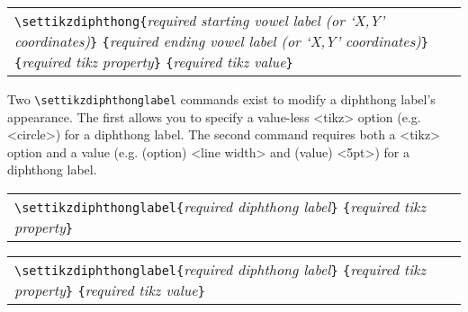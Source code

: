 \documentclass{article}
\newcommand{\pkg}[1]{\texttt{#1}}
\def\\{}%
\def\texttt#1{<#1>}%
\begin{document}
\begin{center}
	\begin{tabular}{l}
		\begin{minipage}[t]{0.85\textwidth}
			{\small
				\verb|\settikzdiphthong{|\textit{required starting vowel label (or `X,Y' coordinates)}\verb|}|\\
				\hspace*{9.5em}\verb|{|\textit{required ending vowel label (or `X,Y' coordinates)}\verb|}|\\
				\hspace*{9.5em}\verb|{|\textit{required tikz property}\verb|}|\\
				\hspace*{9.5em}\verb|{|\textit{required tikz value}\verb|}|
			}
		\end{minipage} \\
	\end{tabular}
\end{center}

\bigskip
\noindent
Two \verb|\settikzdiphthonglabel| commands exist to modify a diphthong label's appearance.  The first allows you to specify a value-less \pkg{tikz} option (e.g. \texttt{circle}) for a diphthong label.  The second command requires both a \pkg{tikz} option and a value (e.g. (option) \texttt{line width} and (value) \texttt{5pt}) for a diphthong label.
\begin{center}
	\begin{tabular}{l}
		\begin{minipage}[t]{0.85\textwidth}
			{\small
				\verb|\settikzdiphthonglabel{|\textit{required diphthong label}\verb|}|\\
				\hspace*{12em}\verb|{|\textit{required tikz property}\verb|}|
			}
		\end{minipage} \\
	\end{tabular}
\end{center}
\begin{center}
	\begin{tabular}{l}
		\begin{minipage}[t]{0.85\textwidth}
			{\small
				\verb|\settikzdiphthonglabel{|\textit{required diphthong label}\verb|}|\\
				\hspace*{12em}\verb|{|\textit{required tikz property}\verb|}|\\
				\hspace*{12em}\verb|{|\textit{required tikz value}\verb|}|
			}
		\end{minipage} \\
	\end{tabular}
\end{center}
\end{document}
